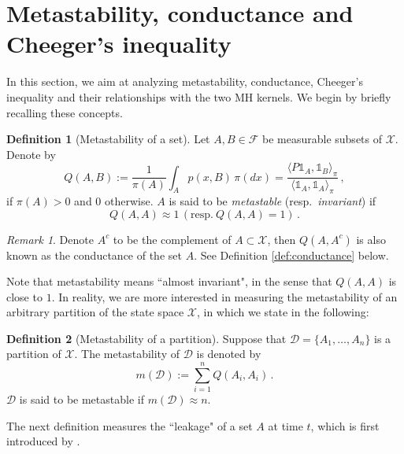 \documentclass[12pt,a4]{amsart}
\numberwithin{equation}{section}
\theoremstyle{plain}
\theoremstyle{definition}
\newtheorem{definition}{Definition}[section]
\theoremstyle{remark}
\newtheorem{rk}{Remark}[section]
\newcommand{\1}{\mathds{1}}
\begin{document}
\section{Metastability, conductance and Cheeger's inequality}\label{sec:metastable}

In this section, we aim at analyzing metastability, conductance, Cheeger's inequality and their relationships with the two MH kernels. We begin by briefly recalling these concepts.

\begin{definition}[Metastability of a set]\label{def:metastability}
	Let $A,B \in \mathcal{F}$ be measurable subsets of $\mathcal{X}$. Denote by
	$$Q(A,B) := \dfrac{1}{\pi(A)} \int_A p(x,B) \, \pi(dx) = \dfrac{\langle P \1_{A}, \1_{B} \rangle_{\pi}}{\langle \1_{A}, \1_{A} \rangle_{\pi}}\,,$$
	if $\pi(A) > 0$ and $0$ otherwise. $A$ is said to be \textit{metastable} (resp.~\textit{invariant}) if 
	$$Q(A,A) \approx 1 \, (\mathrm{resp}.~Q(A,A) = 1)\,.$$	
\end{definition}


\begin{rk}
	Denote $A^c$ to be the complement of $A \subset \mathcal{X}$, then $Q(A,A^c)$ is also known as the conductance of the set $A$. See Definition \ref{def:conductance} below.
\end{rk}

Note that metastability means ``almost invariant", in the sense that $Q(A,A)$ is close to $1$. In reality, we are more interested in measuring the metastability of an arbitrary partition of the state space $\mathcal{X}$, in which we state in the following:

\begin{definition}[Metastability of a partition]
	Suppose that $\mathcal{D} = \{A_1,\ldots,A_n\}$ is a partition of $\mathcal{X}$. The metastability of $\mathcal{D}$ is denoted by
	$$m(\mathcal{D}) := \sum_{i=1}^n Q(A_i,A_i)\,.$$
	$\mathcal{D}$ is said to be metastable if $m(\mathcal{D}) \approx n$.
\end{definition}

The next definition measures the ``leakage" of a set $A$ at time $t$, which is first introduced by \cite{D82, S84}.
\end{document}
